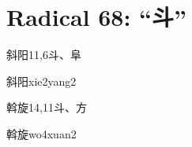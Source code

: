 
\section*{Radical 68: ``⽃''}

\begin{entry}{斜阳}{11,6}{⽃、⾩}
  \begin{phonetics}{斜阳}{xie2yang2}
  \end{phonetics}
\end{entry}

\begin{entry}{斡旋}{14,11}{⽃、⽅}
  \begin{phonetics}{斡旋}{wo4xuan2}
  \end{phonetics}
\end{entry}


